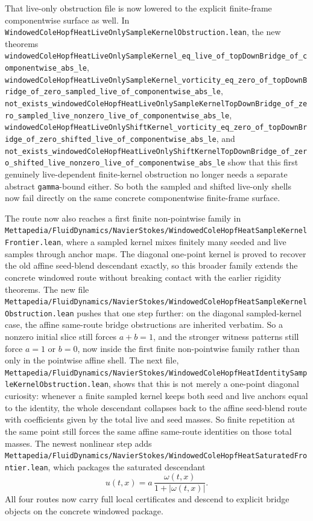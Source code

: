 \documentclass[11pt]{article}
\theoremstyle{remark}
\begin{document}
That live-only obstruction file is now lowered to the explicit finite-frame
componentwise surface as well.  In
\texttt{WindowedColeHopfHeatLiveOnlySampleKernelObstruction.lean}, the new
theorems
\texttt{windowedColeHopfHeatLiveOnlySampleKernel\_eq\_live\_of\_topDownBridge\_of\_componentwise\_abs\_le},
\texttt{windowedColeHopfHeatLiveOnlySampleKernel\_vorticity\_eq\_zero\_of\_topDownBridge\_of\_zero\_sampled\_live\_of\_componentwise\_abs\_le},
\texttt{not\_exists\_windowedColeHopfHeatLiveOnlySampleKernelTopDownBridge\_of\_zero\_sampled\_live\_nonzero\_live\_of\_componentwise\_abs\_le},
\texttt{windowedColeHopfHeatLiveOnlyShiftKernel\_vorticity\_eq\_zero\_of\_topDownBridge\_of\_zero\_shifted\_live\_of\_componentwise\_abs\_le},
and
\texttt{not\_exists\_windowedColeHopfHeatLiveOnlyShiftKernelTopDownBridge\_of\_zero\_shifted\_live\_nonzero\_live\_of\_componentwise\_abs\_le}
show that this first genuinely live-dependent finite-kernel obstruction no
longer needs a separate abstract \texttt{gamma}-bound either.  So both the
sampled and shifted live-only shells now fail directly on the same concrete
componentwise finite-frame surface.

The route now also reaches a first finite non-pointwise family in
\texttt{Mettapedia/FluidDynamics/NavierStokes/WindowedColeHopfHeatSampleKernelFrontier.lean},
where a sampled kernel mixes finitely many seeded and live samples through
anchor maps.  The diagonal one-point kernel is proved to recover the old affine
seed-blend descendant exactly, so this broader family extends the concrete
windowed route without breaking contact with the earlier rigidity theorems.
The new file
\texttt{Mettapedia/FluidDynamics/NavierStokes/WindowedColeHopfHeatSampleKernelObstruction.lean}
pushes that one step further: on the diagonal sampled-kernel case, the affine
same-route bridge obstructions are inherited verbatim.  So a nonzero initial
slice still forces \(a+b=1\), and the stronger witness patterns still force
\(a=1\) or \(b=0\), now inside the first finite non-pointwise family rather
than only in the pointwise affine shell.  The next file,
\texttt{Mettapedia/FluidDynamics/NavierStokes/WindowedColeHopfHeatIdentitySampleKernelObstruction.lean},
shows that this is not merely a one-point diagonal curiosity: whenever a finite
sampled kernel keeps both seed and live anchors equal to the identity, the
whole descendant collapses back to the affine seed-blend route with coefficients
given by the total live and seed masses.  So finite repetition at the same
point still forces the same affine same-route identities on those total masses.
The newest nonlinear step adds
\texttt{Mettapedia/FluidDynamics/NavierStokes/WindowedColeHopfHeatSaturatedFrontier.lean},
which packages the saturated descendant
\[
  u(t,x)=a\,\frac{\omega(t,x)}{1+|\omega(t,x)|}.
\]
All four routes now carry full local certificates and descend to explicit
bridge objects on the concrete windowed package.
\end{document}
